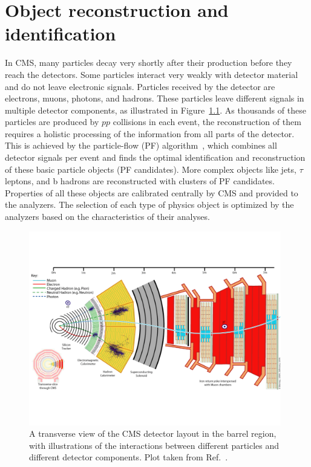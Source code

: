 \chapter{Object reconstruction and identification}\label{chp:objects}

In CMS, many particles decay very shortly after their production before they reach the detectors.
Some particles interact very weakly with detector material and do not leave electronic signals.
Particles received by the detector are electrons, muons, photons, and hadrons. 
These particles leave different signals in multiple detector components,
as illustrated in Figure~\ref{fig:cms_interact}.
As thousands of these particles are produced by $pp$ collisions in each event, 
the reconstruction of them requires a holistic processing of the information from all parts of the detector. 
This is achieved by the particle-flow (PF) algorithm~\cite{Sirunyan_2017}, which combines all detector signals per event
and finds the optimal identification and reconstruction of these basic particle objects (PF candidates).
More complex objects like jets, $\tau$ leptons, and b hadrons are reconstructed with clusters of PF candidates.
Properties of all these objects are calibrated centrally by CMS and provided to the analyzers.
The selection of each type of physics object is optimized by the analyzers based on the characteristics of their analyses.

\begin{figure}[!htb]
    \centering
    \captionsetup{justification=justified}
    \includegraphics[width=0.98\textwidth]{pics/object_reco/CMS Slice.pdf}
    \caption{A transverse view of the CMS detector layout in the barrel region,
             with illustrations of the interactions between different particles and different detector components.
             Plot taken from Ref.~\cite{Davis:2205172}.}
    \label{fig:cms_interact}
\end{figure}


